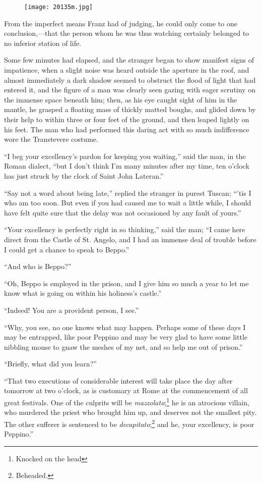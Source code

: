 \begin{figure}[ht]
\texttt{[image: 20135m.jpg]}
\end{figure}

From the imperfect means Franz had of judging, he could only come to
one conclusion,—that the person whom he was thus watching certainly
belonged to no inferior station of life.

Some few minutes had elapsed, and the stranger began to show manifest
signs of impatience, when a slight noise was heard outside the aperture
in the roof, and almost immediately a dark shadow seemed to obstruct
the flood of light that had entered it, and the figure of a man was
clearly seen gazing with eager scrutiny on the immense space beneath
him; then, as his eye caught sight of him in the mantle, he grasped a
floating mass of thickly matted boughs, and glided down by their help
to within three or four feet of the ground, and then leaped lightly on
his feet. The man who had performed this daring act with so much
indifference wore the Transtevere costume.

“I beg your excellency’s pardon for keeping you waiting,” said the man,
in the Roman dialect, “but I don’t think I’m many minutes after my
time, ten o’clock has just struck by the clock of Saint John Lateran.”

“Say not a word about being late,” replied the stranger in purest
Tuscan; “’tis I who am too soon. But even if you had caused me to wait
a little while, I should have felt quite sure that the delay was not
occasioned by any fault of yours.”

“Your excellency is perfectly right in so thinking,” said the man; “I
came here direct from the Castle of St. Angelo, and I had an immense
deal of trouble before I could get a chance to speak to Beppo.”

“And who is Beppo?”

“Oh, Beppo is employed in the prison, and I give him so much a year to
let me know what is going on within his holiness’s castle.”

“Indeed! You are a provident person, I see.”

“Why, you see, no one knows what may happen. Perhaps some of these days
I may be entrapped, like poor Peppino and may be very glad to have some
little nibbling mouse to gnaw the meshes of my net, and so help me out
of prison.”

“Briefly, what did you learn?”

“That two executions of considerable interest will take place the day
after tomorrow at two o’clock, as is customary at Rome at the
commencement of all great festivals. One of the culprits will be
\textit{mazzolato};\footnote[3]{Knocked on the head} he is an atrocious
villain, who murdered the priest who brought him up, and deserves not the
smallest pity. The other sufferer is sentenced to be \textit{decapitato};\footnote[4]{Beheaded.}
and he, your excellency, is poor Peppino.”

